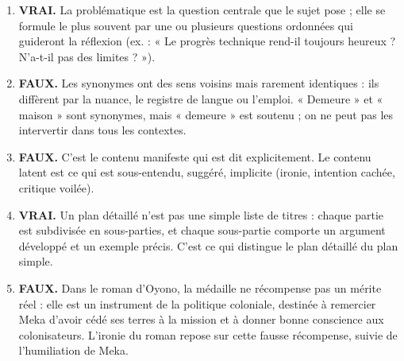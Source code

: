 \documentclass[11pt]{article}
\newcommand{\cle}[1]{{\popxbold\color{popdark}#1}}
\begin{document}
\begin{corrige}

\begin{enumerate}
\item \textbf{VRAI.} La problématique est la question centrale que le sujet pose ; elle se formule le plus souvent par une ou plusieurs questions ordonnées qui guideront la réflexion (ex. : « Le progrès technique rend-il toujours heureux ? N'a-t-il pas des limites ? »).

\item \textbf{FAUX.} Les synonymes ont des sens voisins mais rarement identiques : ils diffèrent par la nuance, le registre de langue ou l'emploi. « Demeure » et « maison » sont synonymes, mais « demeure » est soutenu ; on ne peut pas les intervertir dans tous les contextes.

\item \textbf{FAUX.} C'est le \cle{contenu manifeste} qui est dit explicitement. Le \cle{contenu latent} est ce qui est sous-entendu, suggéré, implicite (ironie, intention cachée, critique voilée).

\item \textbf{VRAI.} Un plan détaillé n'est pas une simple liste de titres : chaque partie est subdivisée en sous-parties, et chaque sous-partie comporte un argument développé et un exemple précis. C'est ce qui distingue le plan détaillé du plan simple.

\item \textbf{FAUX.} Dans le roman d'Oyono, la médaille ne récompense pas un mérite réel : elle est un instrument de la politique coloniale, destinée à remercier Meka d'avoir cédé ses terres à la mission et à donner bonne conscience aux colonisateurs. L'ironie du roman repose sur cette fausse récompense, suivie de l'humiliation de Meka.
\end{enumerate}
\end{corrige}
\end{document}
